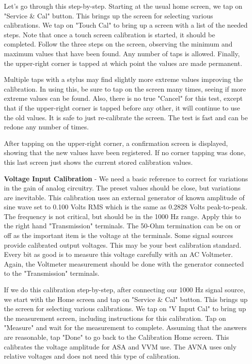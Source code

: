 Let's go through this step-by-step.  Starting at the usual home screen, we tap on "Service \& Cal" button. This brings up the screen for selecting various calibrations.  We tap on "Touch Cal" to bring up a screen with a list of the needed steps. Note that once a touch screen calibration is started, it should be completed.  Follow  the three steps on the screen, observing the minimum and maximum values that have been found.  Any number of taps is allowed.  Finally,  the upper-right corner is tapped at which point the values are made permanent. 

Multiple taps with a stylus may find slightly more extreme values improving the calibration.   In using this, be sure to tap on the screen many times, seeing if more extreme values can be found.  Also, there is no true "Cancel" for this test, except that if the upper-right corner is tapped before any  other, it will continue to use the old values.  It is safe to just re-calibrate the screen.  The test is fast and can be redone any number of times. 

After tapping on the upper-right corner, a confirmation screen is displayed, showing that the new values have been registered.  If no corner tapping was done, this last screen just shows the current stored calibration values.

\textbf{Voltage Input Calibration} - We need a basic reference to correct for variations in the gain of analog circuitry.  The preset values should be close, but variations are inevitable.  This calibration uses an external generator of known amplitude of sine wave set to 0.100 Volts RMS which is the same as 0.2828 Volts peak-to-peak. The frequency is not critical, but should be in the 1000 Hz range.  Apply this to the right hand "Transmission" terminals.  The 50-Ohm termination can be on or off as the important item is the voltage at the terminals.  Some signal sources provide calibrated output voltages.  This may be your best calibration standard.  Every bit as good is to measure this voltage carefully with an AC Voltmeter.  Again, the Voltmeter measurement should be done with the generator connected to the "Transmission" terminals.

If we do this calibration step-by-step, after connecting our 1000 Hz signal source,  we start with the Home screen and tap on "Service \& Cal" button. This brings up the screen for selecting various calibrations.  We tap on "V Input Cal" to bring up the measurement screen, including instructions for this calibration.  Tap on "Measure" and wait for the measurement to complete.  Assuming that the answers are reasonable, tap "Done" to go back to the Calibration Home screen.  This calibrates the voltage amplitude for ASA and VVM use.  The AVNA uses only relative voltages and does not need this type of calibration.

